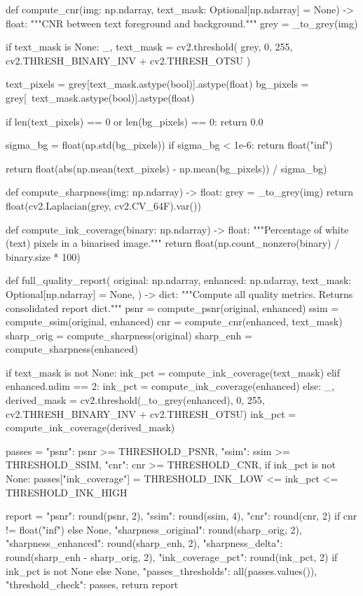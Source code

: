 \begin{tcblisting}
def compute_cnr(img: np.ndarray, text_mask: Optional[np.ndarray] = None) -> float:
    """CNR between text foreground and background."""
    grey = _to_grey(img)

    if text_mask is None:
        _, text_mask = cv2.threshold(
            grey, 0, 255, cv2.THRESH_BINARY_INV + cv2.THRESH_OTSU
        )

    text_pixels = grey[text_mask.astype(bool)].astype(float)
    bg_pixels   = grey[~text_mask.astype(bool)].astype(float)

    if len(text_pixels) == 0 or len(bg_pixels) == 0:
        return 0.0

    sigma_bg = float(np.std(bg_pixels))
    if sigma_bg < 1e-6:
        return float("inf")

    return float(abs(np.mean(text_pixels) - np.mean(bg_pixels)) / sigma_bg)


def compute_sharpness(img: np.ndarray) -> float:
    grey = _to_grey(img)
    return float(cv2.Laplacian(grey, cv2.CV_64F).var())


def compute_ink_coverage(binary: np.ndarray) -> float:
    """Percentage of white (text) pixels in a binarised image."""
    return float(np.count_nonzero(binary) / binary.size * 100)


def full_quality_report(
    original: np.ndarray,
    enhanced: np.ndarray,
    text_mask: Optional[np.ndarray] = None,
) -> dict:
    """Compute all quality metrics. Returns consolidated report dict."""
    psnr       = compute_psnr(original, enhanced)
    ssim       = compute_ssim(original, enhanced)
    cnr        = compute_cnr(enhanced, text_mask)
    sharp_orig = compute_sharpness(original)
    sharp_enh  = compute_sharpness(enhanced)
    
    if text_mask is not None:
        ink_pct = compute_ink_coverage(text_mask)
    elif enhanced.ndim == 2:
        ink_pct = compute_ink_coverage(enhanced)
    else:
        _, derived_mask = cv2.threshold(_to_grey(enhanced), 0, 255, cv2.THRESH_BINARY_INV + cv2.THRESH_OTSU)
        ink_pct = compute_ink_coverage(derived_mask)

    passes = {
        "psnr": psnr >= THRESHOLD_PSNR,
        "ssim": ssim >= THRESHOLD_SSIM,
        "cnr":  cnr  >= THRESHOLD_CNR,
    }
    if ink_pct is not None:
        passes["ink_coverage"] = THRESHOLD_INK_LOW <= ink_pct <= THRESHOLD_INK_HIGH

    report = {
        "psnr":               round(psnr, 2),
        "ssim":               round(ssim, 4),
        "cnr":                round(cnr, 2) if cnr != float("inf") else None,
        "sharpness_original": round(sharp_orig, 2),
        "sharpness_enhanced": round(sharp_enh, 2),
        "sharpness_delta":    round(sharp_enh - sharp_orig, 2),
        "ink_coverage_pct":   round(ink_pct, 2) if ink_pct is not None else None,
        "passes_thresholds":  all(passes.values()),
        "threshold_check":    passes,
    }
    return report
\end{tcblisting}